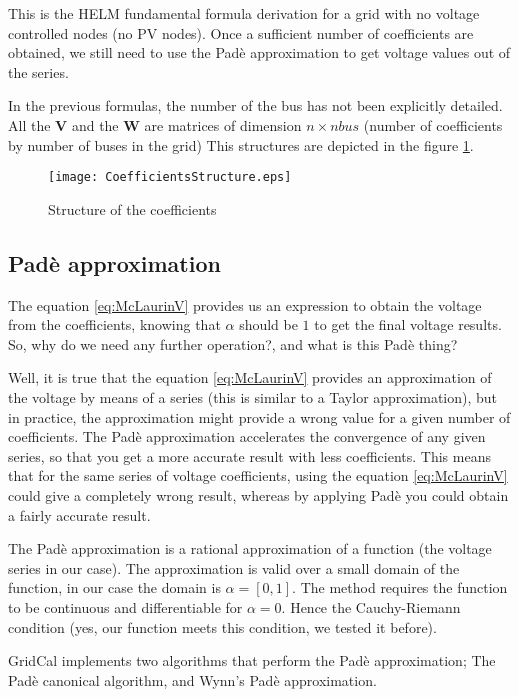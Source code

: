 \documentclass[11pt,fleqn]{book} %
\begin{document}
This is the HELM fundamental formula derivation for a grid with no voltage controlled nodes (no PV nodes). Once a sufficient number of coefficients are obtained, we still need to use the Padè approximation to get voltage values out of the series.


In the previous formulas, the number of the bus has not been explicitly detailed. All the $\textbf{V}$ and the $\textbf{W}$ are matrices of dimension $n \times nbus$ (number of coefficients by number of buses in the grid) This structures are depicted in the figure \ref{fig:CoefficientsStructure}.


\begin{figure}[h]
	\centering
	\texttt{[image: CoefficientsStructure.eps]}
	\caption{Structure of the coefficients}
	\label{fig:CoefficientsStructure}
\end{figure}

\subsection{Padè approximation}

The equation \ref{eq:McLaurinV} provides us an expression to obtain the voltage from the coefficients, knowing that $\alpha$ should be $1$ to get the final voltage results. So, why do we need any further operation?, and what is this Padè thing?

Well, it is true that the equation \ref{eq:McLaurinV} provides an approximation of the voltage by means of a series (this is similar to a Taylor approximation), but in practice, the approximation might provide a wrong value for a given number of coefficients. The Padè approximation accelerates the convergence of any given series, so that you get a more accurate result with less coefficients. This means that for the same series of voltage coefficients, using the equation \ref{eq:McLaurinV} could give a completely wrong result, whereas by applying Padè you could obtain a fairly accurate result.

The Padè approximation is a rational approximation of a function (the voltage series in our case). The approximation is valid over a small domain of the function, in our case the domain is $\alpha=[0,1]$. The method requires the function to be continuous and differentiable for $\alpha=0$. Hence the Cauchy-Riemann condition (yes, our function meets this condition, we tested it before).

GridCal implements two algorithms that perform the Padè approximation; The Padè canonical algorithm, and Wynn's Padè approximation.
\end{document}
